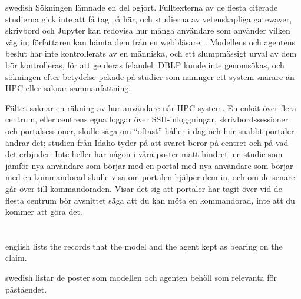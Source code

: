 \begin{onlyin}{swedish}
Sökningen lämnade en del ogjort.  Fulltexterna av de flesta citerade
studierna gick inte att få tag på här, och studierna av vetenskapliga
gatewayer, skrivbord och Jupyter kan redovisa hur många användare som
använder vilken väg in; författaren kan hämta dem från en webbläsare:
\textcite{Chalker2021OnDemand,Lawrence2015Gateways,Paine2020Jupyter,%
Thota2019Desktops,Sampedro2017Sandstone,Nakao2023Fugaku}.  Modellens och
agentens beslut har inte kontrollerats av en människa, och ett
slumpmässigt urval av dem bör kontrolleras, för att ge deras felandel.
DBLP kunde inte genomsökas, och sökningen efter betydelse pekade på
studier som namnger ett system snarare än HPC eller saknar
sammanfattning.

Fältet saknar en räkning av hur användare når HPC-system.  En enkät över
flera centrum, eller centrens egna loggar över SSH-inloggningar,
skrivbordssessioner och portalsessioner, skulle säga om \enquote{oftast}
håller i dag och hur snabbt portaler ändrar det; studien från Idaho
tyder på att svaret beror på centret och på vad det erbjuder.  Inte
heller har någon i våra poster mätt hindret: en studie som jämför nya
användare som börjar med en portal med nya användare som börjar med en
kommandorad skulle visa om portalen hjälper dem in, och om de senare går
över till kommandoraden.  Visar det sig att portaler har tagit över vid
de flesta centrum bör avsnittet säga att du kan möta en kommandorad,
inte att du kommer att göra det.
\end{onlyin}

\section{} %

\begin{onlyin}{english} %
 lists the records that the model and the agent
kept as bearing on the claim.
\end{onlyin}
\begin{onlyin}{swedish}
 listar de poster som modellen och agenten
behöll
som relevanta för påståendet.
\end{onlyin}

